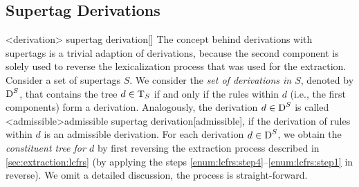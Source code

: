 \documentclass[../../document.tex]{subfiles}
\begin{document}
    \subsection*{ Supertag Derivations}
    <derivation>{ supertag derivation}[]
    The concept behind derivations with  supertags is a trivial adaption of  derivations, because the second component is solely used to reverse the lexicalization process that was used for the extraction.
    Consider a set of  supertags \(S\).
    We consider the \emph{set of derivations in \(S\)}, denoted by \(\operatorname{D}^S\), that contains the tree \(d \in \operatorname{T}_S\) if and only if the  rules within \(d\) (i.e., the first components) form a derivation.
    Analogously, the derivation \(d\in \operatorname{D}^S\) is called <admissible>{admissible  supertag derivation}[admissible], if the derivation of  rules within \(d\) is an admissible derivation.
    For each derivation \(d \in \operatorname{D}^S\), we obtain the \emph{constituent tree for \(d\)} by first reversing the extraction process described in \cref{sec:extraction:lcfrs} (by applying the steps \ref{enum:lcfrs:step4}--\ref{enum:lcfrs:step1} in reverse).
    We omit a detailed discussion, the process is straight-forward.
\end{document}
